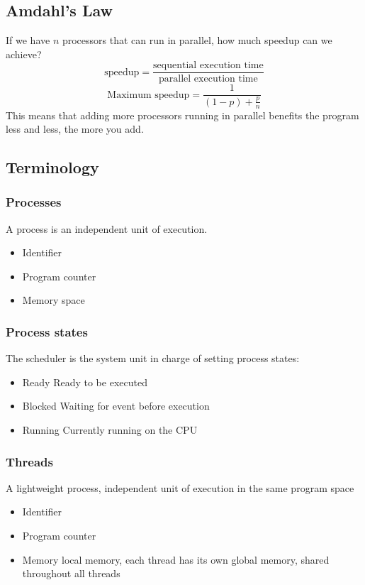 \subsection{Amdahl's Law}
If we have $n$ processors that can run in parallel, how much speedup can we achieve?
$$
	\text{speedup}=\frac{\text{sequential execution time}}{\text{parallel execution time}}
$$
$$
	\text{Maximum speedup}=\frac{1}{(1-p)+\frac{p}{n}}
$$
This means that adding more processors running in parallel benefits the program less and less, the more you add.

\subsection{Terminology}
\subsubsection{Processes}
A process is an independent unit of execution.
\begin{itemize}
	\item Identifier
	\item Program counter
	\item Memory space
\end{itemize}

\subsubsection{Process states}
The scheduler is the system unit in charge of setting process states:
\begin{itemize}
	\item Ready
	      \subitem Ready to be executed
	\item Blocked
	      \subitem Waiting for event before execution
	\item Running
	      \subitem Currently running on the CPU
\end{itemize}

\subsubsection{Threads}
A lightweight process, independent unit of execution in the same program space
\begin{itemize}
	\item Identifier
	\item Program counter
	\item Memory
	      \subitem local memory, each thread has its own
	      \subitem global memory, shared throughout all threads
\end{itemize}

